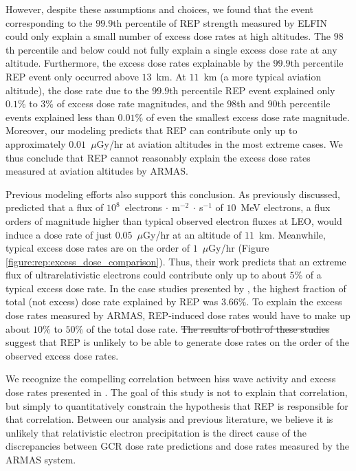 \documentclass[draft]{agujournal2019}
\newcommand{\ugy}{$\mu$Gy}
\providecommand{\DIFadd}[1]{{\protect\color{blue}\uwave{#1}}} %
\providecommand{\DIFdel}[1]{{\protect\color{red}\sout{#1}}}                      %
\providecommand{\DIFaddbegin}{} %
\providecommand{\DIFaddend}{} %
\providecommand{\DIFdelbegin}{} %
\providecommand{\DIFdelend}{} %
\newcommand{\DIFscaledelfig}{0.5}
\newlength{\DIFdelgraphicswidth} %
\newlength{\DIFdelgraphicsheight} %
\newcommand{\DIFaddincludegraphics}[2][]{{\color{blue}\fbox{\DIFOincludegraphics[#1]{#2}}}} %
\newcommand{\DIFdelincludegraphics}[2][]{%
\sbox{\DIFdelgraphicsbox}{\DIFOincludegraphics[#1]{#2}}%
\settoboxwidth{\DIFdelgraphicswidth}{\DIFdelgraphicsbox} %
\settoboxtotalheight{\DIFdelgraphicsheight}{\DIFdelgraphicsbox} %
\scalebox{\DIFscaledelfig}{%
\parbox[b]{\DIFdelgraphicswidth}{\usebox{\DIFdelgraphicsbox}\\[-\baselineskip] \rule{\DIFdelgraphicswidth}{0em}}\llap{\resizebox{\DIFdelgraphicswidth}{\DIFdelgraphicsheight}{%
\setlength{\unitlength}{\DIFdelgraphicswidth}%
\begin{picture}(1,1)%
\thicklines\linethickness{2pt} %
{\color[rgb]{1,0,0}\put(0,0){\framebox(1,1){}}}%
{\color[rgb]{1,0,0}\put(0,0){\line( 1,1){1}}}%
{\color[rgb]{1,0,0}\put(0,1){\line(1,-1){1}}}%
\end{picture}%
}\hspace*{3pt}}} %
} %
\DeclareRobustCommand{\DIFaddbegin}{\DIFOaddbegin \let\includegraphics\DIFaddincludegraphics} %
\DeclareRobustCommand{\DIFaddend}{\DIFOaddend \let\includegraphics\DIFOincludegraphics} %
\DeclareRobustCommand{\DIFdelbegin}{\DIFOdelbegin \let\includegraphics\DIFdelincludegraphics} %
\DeclareRobustCommand{\DIFdelend}{\DIFOaddend \let\includegraphics\DIFOincludegraphics} %
\begin{document}
However, despite these assumptions and choices, we found that the event corresponding to the $99.9$th percentile of REP strength measured by ELFIN could only explain a small number of excess dose rates at high altitudes. The $98$th percentile and below could not fully explain a single excess dose rate at any altitude. Furthermore, the excess dose rates explainable by the $99.9$th percentile REP event only occurred above $13$~km. At $11$~km (a more typical aviation altitude), the dose rate due to the $99.9$th percentile REP event explained only $0.1\%$ to $3\%$ of excess dose rate magnitudes, and the $98$th and $90$th percentile events explained less than $0.01\%$ of even the smallest excess dose rate magnitude. Moreover, our modeling predicts that REP can contribute only up to approximately $0.01$~{\ugy}/hr at aviation altitudes in the most extreme cases. We thus conclude that REP cannot reasonably explain the excess dose rates measured at aviation altitudes by ARMAS.

Previous modeling efforts also support this conclusion. As previously discussed,  predicted that a flux of $10^8$~electrons$~\cdot~$m$^{-2}~\cdot~$s$^{-1}$ of $10$~MeV electrons, a flux orders of magnitude higher than typical observed electron fluxes at LEO, would induce a dose rate of just $0.05$~{\ugy}/hr at an altitude of $11$~km. Meanwhile, typical excess dose rates are on the order of $1$~{\ugy}/hr (Figure \ref{figure:rep:excess_dose_comparison}). Thus, their work predicts that an extreme flux of ultrarelativistic electrons could contribute only up to about $5\%$ of a typical excess dose rate. In the case studies presented by , the highest fraction of total (not excess) dose rate explained by REP was $3.66\%$. To explain the excess dose rates measured by ARMAS, REP-induced dose rates would have to make up about $10\%$ to $50\%$ of the total dose rate. \DIFdelbegin \DIFdel{The results of both of these studies }\DIFdelend \DIFaddbegin \DIFadd{These modeling results }\DIFaddend suggest that REP is unlikely to be able to generate dose rates on the order of the observed excess dose rates.

We recognize the compelling correlation between hiss wave activity and excess dose rates presented in . The goal of this study is not to explain that correlation, but simply to quantitatively constrain the hypothesis that REP is responsible for that correlation. Between our analysis and previous literature, we believe it is unlikely that relativistic electron precipitation is the direct cause of the discrepancies between GCR dose rate predictions and dose rates measured by the ARMAS system.
\end{document}
